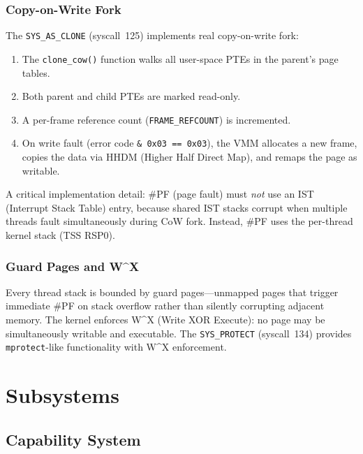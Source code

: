 \documentclass[11pt,a4paper,twoside]{report}
\theoremstyle{definition}
\newcommand{\syscall}[1]{\texttt{#1}}
\begin{document}
\section{Copy-on-Write Fork}

The \syscall{SYS\_AS\_CLONE} (syscall~125) implements real copy-on-write fork:

\begin{enumerate}[leftmargin=1.4em]
  \item The \texttt{clone\_cow()} function walks all user-space PTEs in the
    parent's page tables.
  \item Both parent and child PTEs are marked read-only.
  \item A per-frame reference count (\texttt{FRAME\_REFCOUNT}) is incremented.
  \item On write fault (error code \texttt{\& 0x03 == 0x03}), the VMM
    allocates a new frame, copies the data via HHDM (Higher Half Direct
    Map), and remaps the page as writable.
\end{enumerate}

A critical implementation detail: \#PF (page fault) must \emph{not} use an
IST (Interrupt Stack Table) entry, because shared IST stacks corrupt when
multiple threads fault simultaneously during CoW fork. Instead, \#PF uses
the per-thread kernel stack (TSS RSP0).

\section{Guard Pages and W\^{}X}

Every thread stack is bounded by guard pages---unmapped pages that trigger
immediate \#PF on stack overflow rather than silently corrupting adjacent
memory. The kernel enforces W\^{}X (Write XOR Execute): no page may be
simultaneously writable and executable. The \syscall{SYS\_PROTECT}
(syscall~134) provides \texttt{mprotect}-like functionality with W\^{}X
enforcement.


\part{Subsystems}

\chapter{Capability System}
\label{ch:caps}
\end{document}
